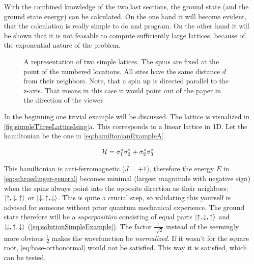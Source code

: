 With the combined knowledge of the two last sections, the ground state (and the ground state energy) can be calculated. On the one hand it will become evident, that the calculation is really simple to do and program. On the other hand it will be shown that it is not feasable to compute sufficiently large lattices, because of the exponential nature of the problem.

\begin{figure}[htbp]
    \centering
    \vspace{-1cm}
    \caption{A representation of two simple latices. The spins are fixed at the point of the numbered locations. All sites have the same distance $d$ from their neighbors. Note, that a spin up \up is directed parallel to the z-axis. That means in this case it would point out of the paper in the direction of the viewer.}
    \label{fig:simpleThreeLatticeIsing}
\end{figure}

In the beginning one trivial example will be discussed. The lattice is visualized in \autoref{fig:simpleThreeLatticeIsing}a.
This corresponds to a linear lattice in 1D. Let the hamiltonian be the one in \autoref{eq:hamiltonianExampleA}.

\begin{equation}
    \label{eq:hamiltonianExampleA}
    \mathcal{H} = \sigma^z_1\sigma^z_2 + \sigma^z_2\sigma^z_3
\end{equation}

This hamiltonian is anti-ferromagnetic ($J = +1$), therefore the energy $E$ in \autoref{eq:schroedinger-general} becomes minimal (largest magnitude with negative sign) when the spins always point into the opposite direction as their neighbors: $\ket{\uparrow, \downarrow, \uparrow}$ or $\ket{\downarrow, \uparrow, \downarrow}$. This is quite a crucial step, so validating this yourself is advised for someone without prior quantum mechanical experience.
The ground state therefore will be a \emph{superposition} consisting of equal parts $\ket{\uparrow, \downarrow, \uparrow}$ and $\ket{\downarrow, \uparrow, \downarrow}$ (\autoref{eq:solutionSimpleExample}). The factor $\frac{1}{\sqrt[]{2}}$ instead of the seemingly more obvious $\frac{1}{2}$ makes the wavefunction be \emph{normalized}. If it wasn't for the square root, \autoref{eq:base-orthonormal} would not be satisfied. This way it is satisfied, which can be tested.

